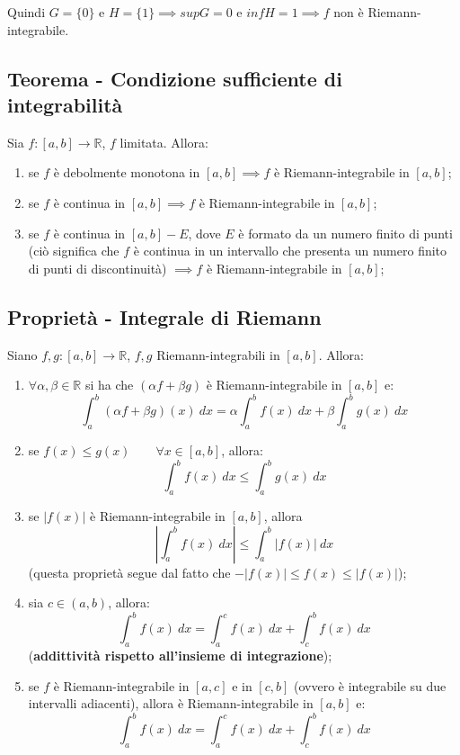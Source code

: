 \documentclass{article}
\begin{document}
\noindent Quindi $G = \{0\}$ e $H = \{1\} \implies supG = 0$ e $infH = 1 \implies f$ non è Riemann-integrabile.

\subsection{Teorema - Condizione sufficiente di integrabilità}
Sia $f: [a, b] \xrightarrow{} \mathbb{R}$, $f$ limitata. Allora:
\begin{enumerate}
    \item se $f$ è debolmente monotona in $[a, b] \implies f$ è Riemann-integrabile in $[a, b]$;
    \item se $f$ è continua in $[a, b] \implies f$ è Riemann-integrabile in $[a, b]$;
    \item se $f$ è continua in $[a, b] - E$, dove $E$ è formato da un numero finito di punti (ciò significa che $f$ è continua in un intervallo che presenta un numero finito di punti di discontinuità) $\implies f$ è Riemann-integrabile in $[a, b]$;
\end{enumerate}

\subsection{Proprietà - Integrale di Riemann}
Siano $f, g: [a, b] \xrightarrow{} \mathbb{R}$, $f, g$ Riemann-integrabili in $[a, b]$. Allora:
\begin{enumerate}
    \item $\forall \alpha, \beta \in \mathbb{R}$ si ha che $(\alpha f + \beta g)$ è Riemann-integrabile in $[a, b]$ e: $$\int_a^b (\alpha f + \beta g)(x) \ dx = \alpha\int_a^b f(x) \ dx + \beta\int_a^b g(x) \ dx$$
    \item se $f(x) \leq g(x) \qquad \forall x \in [a, b]$, allora: $$\int_a^b f(x) \ dx \leq \int_a^b g(x) \ dx$$
    \item se $|f(x)|$ è Riemann-integrabile in $[a, b]$, allora $$\left|\int_a^b f(x) \ dx\right| \leq \int_a^b |f(x)| \ dx$$ (questa proprietà segue dal fatto che $-|f(x)| \leq f(x) \leq |f(x)|$);
    \item sia $c \in (a, b)$, allora: $$\int_a^b f(x) \ dx = \int_a^c f(x) \ dx + \int_c^b f(x) \ dx$$ (\textbf{addittività rispetto all'insieme di integrazione});
    \item se $f$ è Riemann-integrabile in $[a, c]$ e in $[c, b]$ (ovvero è integrabile su due intervalli adiacenti), allora è Riemann-integrabile in $[a, b]$ e: $$\int_a^b f(x) \ dx = \int_a^c f(x) \ dx + \int_c^b f(x) \ dx$$
\end{enumerate}
\end{document}
